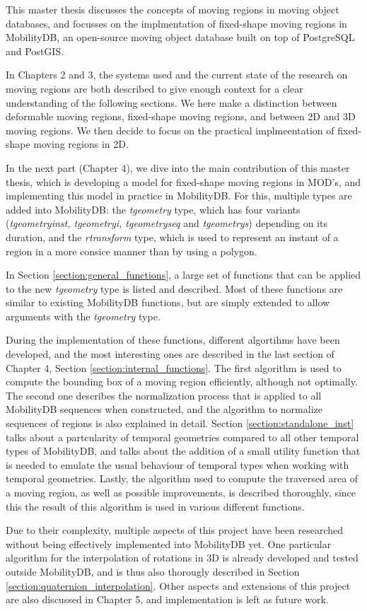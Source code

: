 \label{section:summary}

This master thesis discusses the concepts of moving regions in moving object databases, and focusses on the implmentation of fixed-shape moving regions in MobilityDB, an open-source moving object database built on top of PostgreSQL and PostGIS.

In Chapters 2 and 3, the systems used and the current state of the research on moving regions are both described to give enough context for a clear understanding of the following sections. We here make a distinction between deformable moving regions, fixed-shape moving regions, and between 2D and 3D moving regions. We then decide to focus on the practical implmeentation of fixed-shape moving regions in 2D.

In the next part (Chapter 4), we dive into the main contribution of this master thesis, which is developing a model for fixed-shape moving regions in MOD's, and implementing this model in practice in MobilityDB. For this, multiple types are added into MobilityDB: the \textit{tgeometry} type, which has four variants (\textit{tgeometryinst, tgeometryi, tgeometryseq} and \textit{tgeometrys}) depending on its duration, and the \textit{rtransform} type, which is used to represent an instant of a region in a more consice manner than by using a polygon.

In Section \ref{section:general_functions}, a large set of functions that can be applied to the new \textit{tgeometry} type is listed and described. Most of these functions are similar to existing MobilityDB functions, but are simply extended to allow arguments with the \textit{tgeometry} type.

During the implementation of these functions, different algortihms have been developed, and the most interesting ones are described in the last section of Chapter 4, Section \ref{section:internal_functions}. The first algorithm is used to compute the bounding box of a moving region efficiently, although not optimally. The second one describes the normalization process that is applied to all MobilityDB sequences when constructed, and the algorithm to normalize sequences of regions is also explained in detail. Section \ref{section:standalone_inst} talks about a partcularity of temporal geometries compared to all other temporal types of MobilityDB, and talks about the addition of a small utility function that is needed to emulate the usual behaviour of temporal types when working with temporal geometries. Lastly, the algorithm used to compute the traversed area of a moving region, as well as possible improvements,  is described thoroughly, since this the result of this algorithm is used in various different functions.

Due to their complexity, multiple aspects of this project have been researched without being effectively implemented into MobilityDB yet. One particular algorithm for the interpolation of rotations in 3D is already developed and tested outside MobilityDB, and is thus also thorougly described in Section \ref{section:quaternion_interpolation}. Other aspects and extensions of this project are also discussed in Chapter 5, and implementation is left as future work.